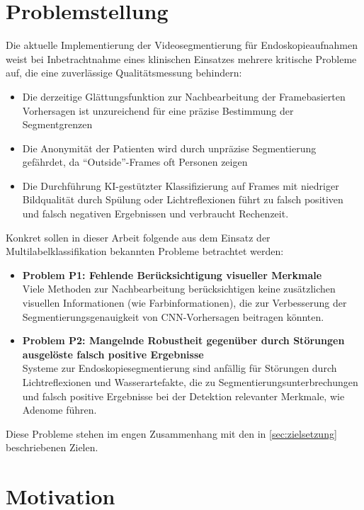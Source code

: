 \section{Problemstellung}

Die aktuelle Implementierung der Videosegmentierung für Endoskopieaufnahmen weist bei Inbetrachtnahme eines klinischen Einsatzes mehrere kritische Probleme auf, die eine zuverlässige Qualitätsmessung behindern:

\begin{itemize}
\item Die derzeitige Glättungsfunktion zur Nachbearbeitung der Framebasierten Vorhersagen ist unzureichend für eine präzise Bestimmung der Segmentgrenzen
\item Die Anonymität der Patienten wird durch unpräzise Segmentierung gefährdet, da \enquote{Outside}-Frames oft Personen zeigen
\item Die Durchführung KI-gestützter Klassifizierung auf Frames mit niedriger Bildqualität durch Spülung oder Lichtreflexionen führt zu falsch positiven und falsch negativen Ergebnissen und verbraucht Rechenzeit.
\end{itemize}

Konkret sollen in dieser Arbeit folgende aus dem Einsatz der Multilabelklassifikation bekannten Probleme betrachtet werden:

\begin{itemize}
\item \textbf{Problem P1: Fehlende Berücksichtigung visueller Merkmale} \\
Viele Methoden zur Nachbearbeitung berücksichtigen keine zusätzlichen visuellen Informationen (wie Farbinformationen), die zur Verbesserung der Segmentierungsgenauigkeit von CNN-Vorhersagen beitragen könnten.

\item \textbf{Problem P2: Mangelnde Robustheit gegenüber durch  Störungen ausgelöste falsch positive Ergebnisse} \\
Systeme zur Endoskopiesegmentierung sind anfällig für Störungen durch Lichtreflexionen und Wasserartefakte, die zu Segmentierungsunterbrechungen und falsch positive Ergebnisse bei der Detektion relevanter Merkmale, wie Adenome führen.
\end{itemize}

Diese Probleme stehen im engen Zusammenhang mit den in \cref{sec:zielsetzung} beschriebenen Zielen.

\section{Motivation}

